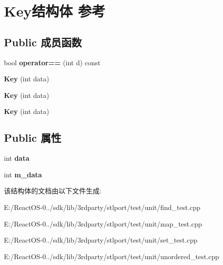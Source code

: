 \hypertarget{struct_key}{}\section{Key结构体 参考}
\label{struct_key}
\subsection*{Public 成员函数}
\begin{DoxyCompactItemize}
\item 
\mbox{\label{struct_key_a3662e629506a9f4edd960490aa0f0e6d}} 
bool {\bfseries operator==} (int d) const
\item 
\mbox{\label{struct_key_a37d8feca0868660eab174387547cb1a6}} 
{\bfseries Key} (int data)
\item 
\mbox{\label{struct_key_a37d8feca0868660eab174387547cb1a6}} 
{\bfseries Key} (int data)
\item 
\mbox{\label{struct_key_a37d8feca0868660eab174387547cb1a6}} 
{\bfseries Key} (int data)
\end{DoxyCompactItemize}
\subsection*{Public 属性}
\begin{DoxyCompactItemize}
\item 
\mbox{\label{struct_key_afecfaf4afa4e6ffd3fe48fa3add6b4db}} 
int {\bfseries data}
\item 
\mbox{\label{struct_key_a169a1b950b645d6adc5d9422d3b1cc69}} 
int {\bfseries m\+\_\+data}
\end{DoxyCompactItemize}


该结构体的文档由以下文件生成\+:\begin{DoxyCompactItemize}
\item 
E\+:/\+React\+O\+S-\/0../sdk/lib/3rdparty/stlport/test/unit/find\+\_\+test.\+cpp\item 
E\+:/\+React\+O\+S-\/0../sdk/lib/3rdparty/stlport/test/unit/map\+\_\+test.\+cpp\item 
E\+:/\+React\+O\+S-\/0../sdk/lib/3rdparty/stlport/test/unit/set\+\_\+test.\+cpp\item 
E\+:/\+React\+O\+S-\/0../sdk/lib/3rdparty/stlport/test/unit/unordered\+\_\+test.\+cpp\end{DoxyCompactItemize}
